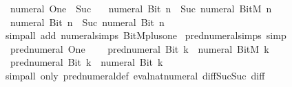 \begin{isabellebody}
\ \ {\isachardoublequoteopen}numeral\ One\ {\isacharequal}{\kern0pt}\ Suc\ {}{\isachardoublequoteclose}\isanewline
\ \ {\isachardoublequoteopen}numeral\ {\isacharparenleft}{\kern0pt}Bit{}\ n{\isacharparenright}{\kern0pt}\ {\isacharequal}{\kern0pt}\ Suc\ {\isacharparenleft}{\kern0pt}numeral\ {\isacharparenleft}{\kern0pt}BitM\ n{\isacharparenright}{\kern0pt}{\isacharparenright}{\kern0pt}{\isachardoublequoteclose}\isanewline
\ \ {\isachardoublequoteopen}numeral\ {\isacharparenleft}{\kern0pt}Bit{}\ n{\isacharparenright}{\kern0pt}\ {\isacharequal}{\kern0pt}\ Suc\ {\isacharparenleft}{\kern0pt}numeral\ {\isacharparenleft}{\kern0pt}Bit{}\ n{\isacharparenright}{\kern0pt}{\isacharparenright}{\kern0pt}{\isachardoublequoteclose}\isanewline
%
\isadelimproof
\ \ %
\endisadelimproof
%
\isatagproof
{}\isamarkupfalse%
\ {\isacharparenleft}{\kern0pt}simp{\isacharunderscore}{\kern0pt}all\ add{\isacharcolon}{\kern0pt}\ numeral{\isachardot}{\kern0pt}simps\ BitM{\isacharunderscore}{\kern0pt}plus{\isacharunderscore}{\kern0pt}one{\isacharparenright}{\kern0pt}%
\endisatagproof
{\isafoldproof}%
%
\isadelimproof
\isanewline
%
\endisadelimproof
\isanewline
{}\isamarkupfalse%
\ pred{\isacharunderscore}{\kern0pt}numeral{\isacharunderscore}{\kern0pt}simps\ {\isacharbrackleft}{\kern0pt}simp{\isacharbrackright}{\kern0pt}{\isacharcolon}{\kern0pt}\isanewline
\ \ {\isachardoublequoteopen}pred{\isacharunderscore}{\kern0pt}numeral\ One\ {\isacharequal}{\kern0pt}\ {}{\isachardoublequoteclose}\isanewline
\ \ {\isachardoublequoteopen}pred{\isacharunderscore}{\kern0pt}numeral\ {\isacharparenleft}{\kern0pt}Bit{}\ k{\isacharparenright}{\kern0pt}\ {\isacharequal}{\kern0pt}\ numeral\ {\isacharparenleft}{\kern0pt}BitM\ k{\isacharparenright}{\kern0pt}{\isachardoublequoteclose}\isanewline
\ \ {\isachardoublequoteopen}pred{\isacharunderscore}{\kern0pt}numeral\ {\isacharparenleft}{\kern0pt}Bit{}\ k{\isacharparenright}{\kern0pt}\ {\isacharequal}{\kern0pt}\ numeral\ {\isacharparenleft}{\kern0pt}Bit{}\ k{\isacharparenright}{\kern0pt}{\isachardoublequoteclose}\isanewline
%
\isadelimproof
\ \ %
\endisadelimproof
%
\isatagproof
{}\isamarkupfalse%
\ {\isacharparenleft}{\kern0pt}simp{\isacharunderscore}{\kern0pt}all\ only{\isacharcolon}{\kern0pt}\ pred{\isacharunderscore}{\kern0pt}numeral{\isacharunderscore}{\kern0pt}def\ eval{\isacharunderscore}{\kern0pt}nat{\isacharunderscore}{\kern0pt}numeral\ diff{\isacharunderscore}{\kern0pt}Suc{\isacharunderscore}{\kern0pt}Suc\ diff{\isacharunderscore}{\kern0pt}{}{\isacharparenright}{\kern0pt}%

\end{isabellebody}
